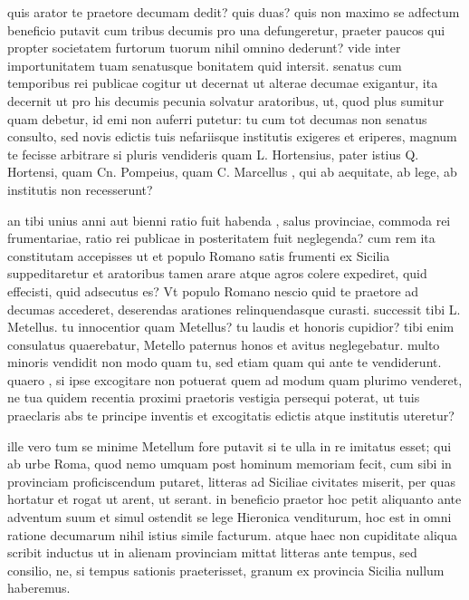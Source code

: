  quis arator te praetore decumam dedit? quis duas? quis non maximo se adfectum beneficio putavit cum tribus decumis pro una defungeretur, praeter paucos qui propter societatem furtorum tuorum nihil omnino dederunt? vide inter importunitatem tuam senatusque bonitatem quid intersit. senatus cum temporibus rei publicae cogitur ut decernat ut alterae decumae exigantur, ita decernit ut pro his decumis pecunia solvatur aratoribus, ut, quod plus sumitur quam debetur, id emi non auferri putetur: tu cum tot decumas non senatus consulto, sed novis edictis tuis nefariisque institutis exigeres et eriperes, magnum te fecisse arbitrare si pluris vendideris quam L. Hortensius, pater istius Q. Hortensi, quam Cn. Pompeius, quam C. Marcellus , qui ab aequitate, ab lege, ab institutis non recesserunt?

 an tibi unius anni aut bienni ratio fuit habenda , salus provinciae, commoda rei frumentariae, ratio rei publicae in posteritatem fuit neglegenda? cum rem ita constitutam accepisses ut et populo Romano satis frumenti ex Sicilia suppeditaretur et aratoribus tamen arare atque agros colere expediret, quid effecisti, quid adsecutus es? Vt populo Romano nescio quid te praetore ad decumas accederet, deserendas arationes relinquendasque curasti. successit tibi L. Metellus. tu innocentior quam Metellus? tu laudis et honoris cupidior? tibi enim consulatus quaerebatur, Metello paternus honos et avitus neglegebatur. multo minoris vendidit non modo quam tu, sed etiam quam qui ante te vendiderunt. quaero , si ipse excogitare non potuerat quem ad modum quam plurimo venderet, ne tua quidem recentia proximi praetoris vestigia persequi poterat, ut tuis praeclaris abs te principe inventis et excogitatis edictis atque institutis uteretur?

 ille vero tum se minime Metellum fore putavit si te ulla in re imitatus esset; qui ab urbe Roma, quod nemo umquam post hominum memoriam fecit, cum sibi in provinciam proficiscendum putaret, litteras ad Siciliae civitates miserit, per quas hortatur et rogat ut arent, ut serant. in beneficio praetor hoc petit aliquanto ante adventum suum et simul ostendit se lege Hieronica venditurum, hoc est in omni ratione decumarum nihil istius simile facturum. atque haec non cupiditate aliqua scribit inductus ut in alienam provinciam mittat litteras ante tempus, sed consilio, ne, si tempus sationis praeterisset, granum ex provincia Sicilia nullum haberemus.

